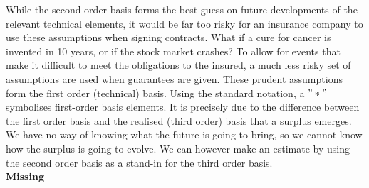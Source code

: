 \documentclass[12pt]{article}
\theoremstyle{my_thm}
\begin{document}
While the second order basis forms the best guess on future developments of the relevant technical elements, it would be far too risky for an insurance company to use these assumptions when signing contracts. What if a cure for cancer is invented in 10 years, or if the stock market crashes? To allow for events that make it difficult to meet the obligations to the insured, a much less risky set of assumptions are used when guarantees are given. These prudent assumptions form the first order (technical) basis. Using the standard notation, a $"*"$ symbolises first-order basis elements. It is precisely due to the difference between the first order basis and the realised (third order) basis that a surplus emerges. We have no way of knowing what the future is going to bring, so we cannot know how the surplus is going to evolve. We can however make an estimate by using the second order basis as a stand-in for the third order basis.
\\
\textbf{Missing}
\end{document}

